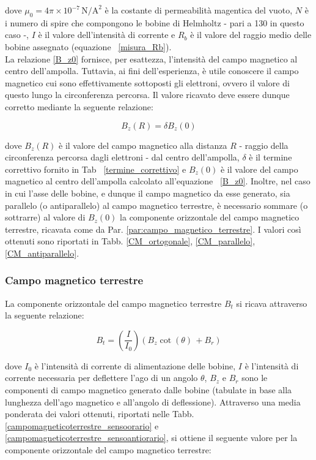 \documentclass[]{article}
\begin{document}
    dove $\mu _0 = 4\pi \times 10^{-7} \, \text{N/A}^2 $ è la costante di permeabilità magentica del vuoto, $N$ è i numero di spire che compongono le bobine di Helmholtz - pari a 130 in questo caso -, $I$ è il valore dell'intensità di corrente e $R_b$ è il valore del raggio medio delle bobine assegnato (equazione ~\ref{misura_Rb}). \\
    La relazione \ref{B_z0} fornisce, per esattezza, l'intensità del campo magnetico al centro dell'ampolla. Tuttavia, ai fini dell'esperienza, è utile conoscere il campo magnetico cui sono effettivamente sottoposti gli elettroni, ovvero il valore di questo lungo la circonferenza percorsa. Il valore ricavato deve essere dunque corretto mediante la seguente relazione:

    \begin{equation}
        \label{B_zR}
        B_z(R) = \delta B_z(0)
    \end{equation}

    dove $B_z(R) $ è il valore del campo magnetico alla distanza $ R $ - raggio della circonferenza percorsa dagli elettroni - dal centro dell'ampolla, $\delta$ è il termine correttivo fornito in Tab ~\ref{termine_correttivo} e $B_z(0)$ è il valore del campo magnetico al centro dell'ampolla calcolato all'equazione ~\ref{B_z0}.
    Inoltre, nel caso in cui l'asse delle bobine, e dunque il campo magnetico da esse generato, sia parallelo (o antiparallelo) al campo magnetico terrestre, è necessario sommare (o sottrarre) al valore di $B_z(0)$ la componente orizzontale del campo magnetico terrestre, ricavata come da Par. \ref{par:campo_magnetico_terrestre}. I valori così ottenuti sono riportati in Tabb. \ref{CM_ortogonale}, \ref{CM_parallelo}, \ref{CM_antiparallelo}.

    \subsubsection{Campo magnetico terrestre}
    La componente orizzontale del campo magnetico terrestre $B_t $ si ricava attraverso la seguente relazione:

    \begin{equation}
        \label{mag_terr}
        B_t= \left(\frac{I}{I_0}\right) (B_z \cot(\theta) \, + B_r)
    \end{equation}
    
    dove $ I_0 $ è l'intensità di corrente di alimentazione delle bobine, $ I $ è l'intensità di corrente necessaria per deflettere l'ago di un angolo $ \theta $, $B_z$ e $B_r$ sono le componenti di campo magnetico generato dalle bobine (tabulate in base alla lunghezza dell'ago magnetico e all'angolo di deflessione).
    Attraverso una media ponderata dei valori ottenuti, riportati nelle Tabb. \ref{campomagneticoterrestre_sensoorario} e \ref{campomagneticoterrestre_sensoantiorario}, si ottiene il seguente valore per la componente orizzontale del campo magnetico terrestre:
\end{document}
